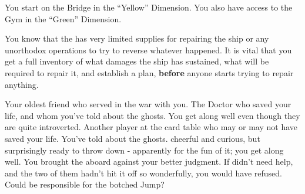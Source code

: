 \documentclass[char]{TMFHope}
\begin{document}
\begin{itemz}[Notes]
	\item You start on the Bridge in the ``Yellow'' Dimension. You also have access to the Gym in the ``Green'' Dimension. 
	\item You know that the \pNew{} has very limited supplies for repairing the ship or any unorthodox operations to try to reverse whatever happened. It is vital that you get a full inventory of what damages the ship has sustained, what will be required to repair it, and establish a plan, {\bf before} anyone starts trying to repair anything.
\end{itemz}

\begin{contacts}
	\contact{\cXO{}} Your oldest friend who served in the war with you.
	\contact{\cMed{}} The Doctor who saved your life, and whom you've told about the ghosts. You get along well even though they are quite introverted.
	\contact{\cSci{}} Another player at the card table who may or may not have saved your life. You've told \cSci{\them} about the ghosts. \cSci{\They} \cSci{\are} cheerful and curious, but surprisingly ready to throw down - apparently for the fun of it; you get along well.
	\contact{\cBoy{}} You brought the \cBoy{\kid} aboard against your better judgment. If \cEng{} didn't need help, and the two of them hadn't hit it off so wonderfully, you would have refused. Could \cBoy{} be responsible for the botched Jump?
\end{contacts}
\end{document}
